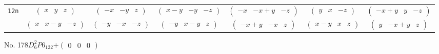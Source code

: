 \documentclass[fleqn,9pt,landscape]{jsarticle}
\begin{document}
\begin{center}
\begin{longtable}{ccccccc}
{\tt 12n} & $ \begin{pmatrix} x & y & z \end{pmatrix} $ & $ \begin{pmatrix} - x & - y & z \end{pmatrix} $ & $ \begin{pmatrix} x - y & - y & - z \end{pmatrix} $ & $ \begin{pmatrix} - x & - x + y & - z \end{pmatrix} $ & $ \begin{pmatrix} y & x & - z \end{pmatrix} $ & $ \begin{pmatrix} - x + y & y & - z \end{pmatrix} $ \\
& $ \begin{pmatrix} x & x - y & - z \end{pmatrix} $ & $ \begin{pmatrix} - y & - x & - z \end{pmatrix} $ & $ \begin{pmatrix} - y & x - y & z \end{pmatrix} $ & $ \begin{pmatrix} - x + y & - x & z \end{pmatrix} $ & $ \begin{pmatrix} x - y & x & z \end{pmatrix} $ & $ \begin{pmatrix} y & - x + y & z \end{pmatrix} $ \\
\end{longtable}
\end{center}
\newpage
No. 178\quad$D_{6}^{2}$\quad$P6_122$\quad[ hexagonal ]\quad$+\begin{pmatrix} 0 & 0 & 0 \end{pmatrix}$
\end{document}
